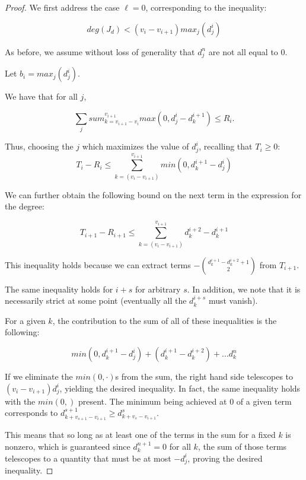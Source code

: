 \documentclass[11pt,letterpaper]{amsart}
\begin{document}
\begin{proof}

We first address the case $\ell=0$, corresponding to the inequality:

$$deg(J_d)< (v_{i}-v_{i+1})max_j(d^i_j)$$


As before, we assume without loss of generality that $d^n_j$ are not all equal to 0.

Let $b_{i}=max_j(d^{i}_j)$. 

We have that for all $j$, 

\begin{equation}
    \label{master}
    \sum_j sum_{k=v_{i+1}-v_i}^{v_{i+1}} max(0,d^{i}_j-d^{i+1}_k)\leq R_i. 
\end{equation}

Thus, choosing the $j$ which maximizes the value of $d^i_j$, recalling that $T_i\geq 0$:
\begin{equation}
    \label{grn1}
    T_i-R_i\leq \sum_{k=(v_{i}-v_{i+1})}^{v_{i+1}}min(0,d^{i+1}_k-d^i_j)
\end{equation}


We can further obtain the following bound on the next term in the expression for the degree:

\begin{equation}
    \label{grn2}
    T_{i+1}-R_{i+1}\leq \sum_{k=(v_{i}-v_{i+1})}^{v_{i+1}}d^{i+2}_k-d^{i+1}_k
\end{equation}

This inequality holds because we can extract terms $-\binom{d^{i+1}_k-d^{i+2}_k+1}{2}$ from $T_{i+1}$.

The same inequality holds for $i+s$ for arbitrary $s$. In addition, we note that it is necessarily strict at some point (eventually all the $d^{i+s}_k$ must vanish).

For a given $k$, the contribution to the sum of all of these inequalities is the following:


$$min(0,d^{i+1}_k-d^i_j)+(d^{i+1}_k-d^{i+2}_k)+\dots d^n_k$$



If we eliminate the $min(0,\cdot)$s from the sum, the right hand side telescopes to $(v_i-v_{i+1})d^i_j$, yielding the desired inequality. In fact, the same inequality holds with the $min(0,)$ present. The minimum being achieved at $0$ of a given term corresponds to $d^{s+1}_{k+v_{s+1}-v_{i+1}}\geq d^{s}_{k+v_s-v_{i+1}}$. 

This means that so long as at least one of the terms in the sum for a fixed $k$ is nonzero, which is guaranteed since $d^{n+1}_k=0$ for all $k$, the sum of those terms telescopes to a quantity that must be at most $-d^i_j$, proving the desired inequality. 










\end{proof}
\end{document}
